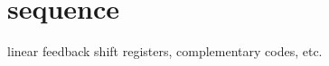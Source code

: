 % 
%

\section{sequence}
\label{module:sequence}
linear feedback shift registers, complementary codes, etc.

